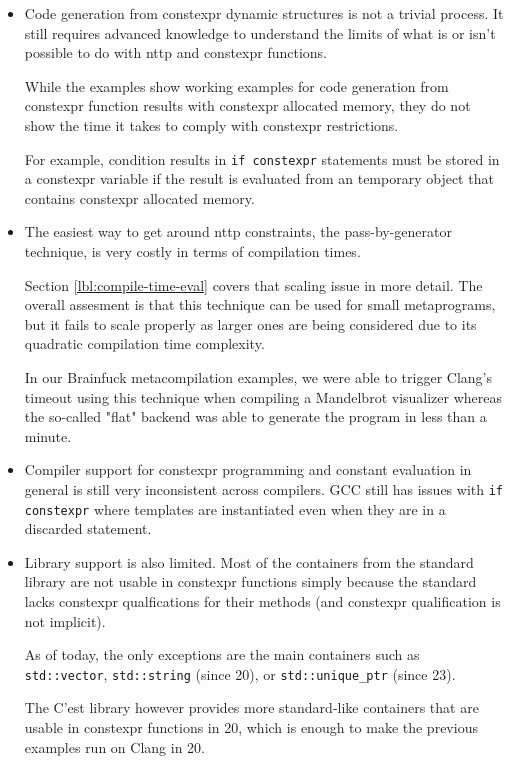 \documentclass[../main]{subfiles}
\begin{document}
\begin{itemize}

\item
Code generation from \gls{constexpr} dynamic structures is not a trivial process.
It still requires advanced \cpp knowledge to understand the limits of what
is or isn't possible to do with \acrshort{nttp}\glspluralsuffix{} and \gls{constexpr} functions.

While the examples show working examples for code generation from \gls{constexpr}
function results with \gls{constexpr} allocated memory, they do not show the time
it takes to comply with \cpp \gls{constexpr} restrictions.

For example, condition results in \lstinline{if constexpr} statements must be
stored in a \gls{constexpr} variable if the result is evaluated from an temporary
object that contains \gls{constexpr} allocated memory.

\item
The easiest way to get around \acrshort{nttp} constraints, \ie the pass-by-generator
technique, is very costly in terms of compilation times.

Section \ref{lbl:compile-time-eval} covers that scaling issue in more detail.
The overall assesment is that this technique can be used for small metaprograms,
but it fails to scale properly as larger ones are being considered
due to its quadratic compilation time complexity.

In our Brainfuck metacompilation examples, we were able to trigger Clang's
timeout using this technique when compiling a Mandelbrot visualizer
whereas the so-called "flat" backend was able to generate the program in less
than a minute.

\item
Compiler support for \gls{constexpr} programming and constant evaluation in general
is still very inconsistent across compilers. GCC still has issues with
\lstinline{if constexpr} where templates are instantiated even when they are
in a discarded statement.

\item
Library support is also limited.
Most of the containers from the \cpp standard library are not usable in
\gls{constexpr} functions simply because the \cpp standard lacks \gls{constexpr}
qualfications for their methods (and \gls{constexpr} qualification is not implicit).

As of today, the only exceptions are the main containers such as
\lstinline{std::vector}, \lstinline{std::string} (since \cpp{}20),
or \lstinline{std::unique_ptr} (since \cpp{}23).

The C'est \cite{cest} library however provides more standard-like containers
that are usable in \gls{constexpr} functions in \cpp{}20, which is enough to make
the previous examples run on Clang in \cpp{}20.

\end{itemize}
\end{document}

